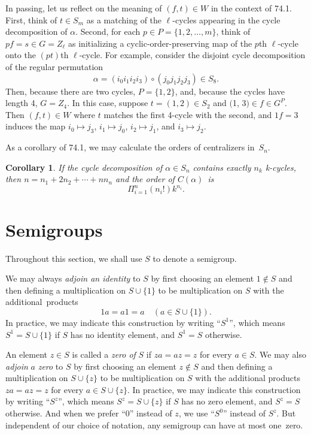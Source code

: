 \documentclass{surv-l}
\numberwithin{equation}{section}
\numberwithin{table}{section}
\numberwithin{figure}{section}
\theoremstyle{plain}
\newtheorem{corollary}[equation]{Corollary}
\theoremstyle{definition}
\begin{document}
In passing, let us reflect on the meaning of $(f, t)\in W$ in
the context of 74.1. First, think of $t\in S_{m}$ as a
matching of the $\ell$-cycles appearing in the cycle
decomposition of $\alpha$. Second, for each $p\in P=\{1,
2,\ldots, m\}$, think of $pf=s\in G=Z_{\ell}$ as initializing
a cyclic-order-preserving map of the $p$th $\ell$-cycle onto
the $(pt)$th $\ell$-cycle. For example, consider the disjoint
cycle decomposition of the regular permutation
\[
\alpha=(i_{0}i_{1}i_{2}i_{3})\circ(j_{0}j_{1}j_{2}j_{3})\in S_{8}.
\]
Then, because there are two cycles, $P=\{1,2\}$, and, because
the cycles have length 4, $G=Z_{4}$. In this case, suppose
$t=(1,2)\in S_{2}$ and $($1, $3)\in f\in G^{P}$. Then
$(f,t)\in W$ where $t$ matches the first 4-cycle with the
second, and $1f=3$ induces the map $i_{0}\mapsto j_{3}$,
$i_{1}\mapsto j_{0}$, $i_{2}\mapsto j_{1}$, and $i_{3}\mapsto
j_{2}$.

As a corollary of 74.1, we may calculate the orders of
centralizers in~$S_{n}$.

\begin{corollary}\label{corA.74.2}
If the cycle decomposition of $\alpha\in S_{n}$ contains
exactly $n_{k}$ k-cycles, then $n=n_{1}+2n_{2}+\cdots+nn_{n}$
and the order of $C(\alpha)$~is
\[
\Pi_{i=1}^{n}(n_{i}!)k^{n_{i}}.
\]
\end{corollary}

\section{Semigroups}\label{secA.75}

Throughout this section, we shall use $S$ to denote a semigroup.

We may always \emph{adjoin an identity}
to $S$ by first choosing an element $1\not\in S$ and then defining
a multiplication on $S\cup\{1\}$ to be multiplication on $S$ with
the additional~products
\[
1a =a1=a\quad (a\in S \cup \{1\}).
\]
In practice, we may indicate this construction by writing
``$S^{1}$'', which means $S^{1}=S\cup\{1\}$ if $S$ has no
identity element, and $S^{1}=S$ otherwise.

An element $z\in S$ is called a \emph{zero of} $S$ if $za=az=z$
for every $a \in S$. We may also \emph{adjoin} $a$
\emph{zero} to $S$ by first choosing an
element $z\not\in S$ and then defining a multiplication on $S\cup
\{z\}$ to be multiplication on $S$ with the additional products
$za=az =z$ for every $a\in S \cup \{z\}$. In practice, we may
indicate this construction by writing ``$S^{z}$'', which means $S^{z}=
S\cup \{z\}$ if $S$ has no zero element, and $S^{z}=S$ otherwise.
And when we prefer ``0'' instead of $z$, we use ``$S^{0}$''
instead of $S^{z}$. But independent of our choice of notation, any
semigroup can have at most one~zero.
\end{document}
